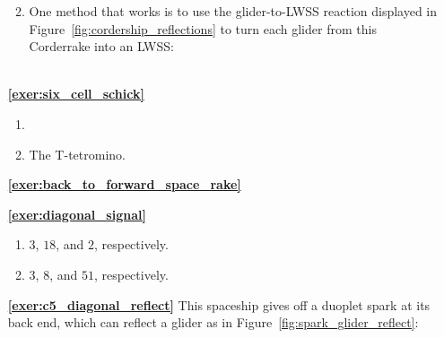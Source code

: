 \begin{multicols}{2}
\begin{itemize}[leftmargin=0em]
\begin{enumerate}[leftmargin=1.5em,label=\bf\color{ocre}(\alph*)]
			
			\item One method that works is to use the glider-to-LWSS reaction displayed in Figure~\ref{fig:cordership_reflections} to turn each glider from this Corderrake into an LWSS: \\[-0.6em]
			
			\\
		\end{enumerate}
		
		
		\item[\bf\color{ocre}\sffamily\ref{exer:six_cell_schick}]
		\begin{enumerate}[leftmargin=1.5em,label=\bf\color{ocre}(\alph*)]
			\item {} \\
			
			\item The T-tetromino. \\
		\end{enumerate}
		
		
		\item[\bf\color{ocre}\sffamily\ref{exer:back_to_forward_space_rake}]  \\
		
		
		\item[\bf\color{ocre}\sffamily\ref{exer:diagonal_signal}]
		\begin{enumerate}[leftmargin=1.5em,label=\bf\color{ocre}(\alph*)]
			\item $3$, $18$, and $2$, respectively. \\
			
			\item $3$, $8$, and $51$, respectively. \\
		\end{enumerate}
		
		
		\item[\bf\color{ocre}\sffamily\ref{exer:c5_diagonal_reflect}] This spaceship gives off a duoplet spark at its back end, which can reflect a glider as in Figure~\ref{fig:spark_glider_reflect}: \\[-0.6em]
		
		 \\
	\end{itemize}
\end{multicols}


